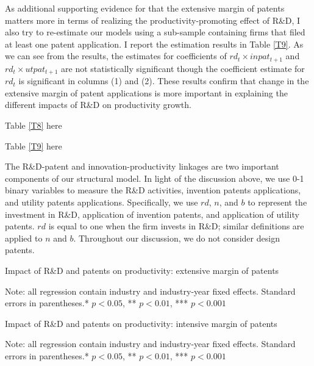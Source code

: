 As additional supporting evidence for that the extensive margin of
patents matters more in terms of realizing the productivity-promoting
effect of R\&D, I also try to re-estimate our models using a sub-sample
containing firms that filed at least one patent application. I
report the estimation results in Table \ref{T9}. As we can see from
the results, the estimates for coefficients of $rd_{t}\times inpat_{t+1}$
and $rd_{t}\times utpat_{t+1}$ are not statistically significant
though the coefficient estimate for $rd_{t}$ is significant in columns
(1) and (2). These results confirm that change in the extensive margin
of patent applications is more important in explaining the different
impacts of R\&D on productivity growth. 

\begin{center}
Table \ref{T8} here
\par\end{center}

\begin{center}
Table \ref{T9} here
\par\end{center}

The R\&D-patent and innovation-productivity linkages are two important components of our structural model. In light of the discussion above, we use 0-1 binary variables to measure the R\&D activities, invention patents applications, and utility patents applications. Specifically, we use $rd$, $n$, and $b$ to represent the investment in R\&D, application of invention
patents, and application of utility patents. $rd$ is equal to one
when the firm invests in R\&D; similar definitions are applied to
$n$ and $b$. Throughout our discussion, we do not consider design patents. 



\begin{table}[H]
\centering
\caption{Impact of R\&D and patents on productivity: extensive margin of patents}
\label{T8}

\caption*{\small{}Note: all regression contain industry and industry-year fixed effects. Standard errors in parentheses.{*} \(p<0.05\), {**} \(p<0.01\), {***} \(p<0.001\)} {\small \par}
\end{table}


\begin{table}[H]
\centering
\caption{Impact of R\&D and patents on productivity: intensive margin of patents}
\label{T9}

\caption*{\small{}Note: all regression contain industry and industry-year fixed effects. Standard errors in parentheses.{*} \(p<0.05\), {**} \(p<0.01\), {***} \(p<0.001\)} {\small \par}
\end{table}